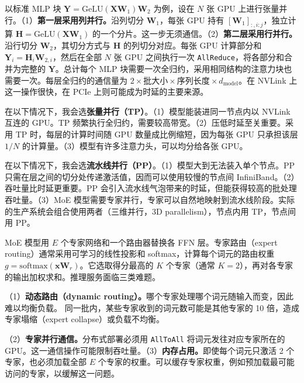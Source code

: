 \begin{interview}
以标准 MLP 块 \(\mathbf{Y}=\mathrm{GeLU}(\mathbf{X}\mathbf{W}_1)\mathbf{W}_2\) 为例，设在 \(N\) 张 GPU 上进行张量并行。（1）\textbf{第一层采用列并行。}沿列切分 \(\mathbf{W}_1\)，每张 GPU 持有 \([\mathbf{W}_1]_{:,i:j}\)，独立计算 \(\mathbf{H}=\mathrm{GeLU}(\mathbf{X}\mathbf{W}_1)\) 的一个分片。这一步无须通信。（2）\textbf{第二层采用行并行。}沿行切分 \(\mathbf{W}_2\)，其切分方式与 \(\mathbf{H}\) 的列切分对应。每张 GPU 计算部分和 \(\mathbf{Y}_i=\mathbf{H}_i\mathbf{W}_{2,i}\)，然后在全部 \(N\) 张 GPU 之间执行一次 \texttt{AllReduce}，将各部分和合并为完整的 \(\mathbf{Y}\)。总计每个 MLP 块需要一次全归约，采用相同结构的注意力块也需要一次。每层全归约的通信量为 \(2\times\text{批大小}\times\text{序列长度}\times d_{\mathrm{model}}\)。在 NVLink 上这一操作很快，在 PCIe 上则可能成为时延的主要来源。

在以下情况下，我会选\textbf{张量并行（TP）}。（1）模型能装进同一节点内以 NVLink 互连的 GPU。TP 频繁执行全归约，需要较高带宽。（2）压低时延至关重要。采用 TP 时，每层的计算时间随 GPU 数量成比例缩短，因为每张 GPU 只承担该层 \(1/N\) 的计算量。（3）模型有许多注意力头，可以均分给各张 GPU。

在以下情况下，我会选\textbf{流水线并行（PP）}。（1）模型大到无法装入单个节点。PP 只需在层之间的切分处传递激活值，因而可以使用较慢的节点间 InfiniBand。（2）吞吐量比时延更重要。PP 会引入流水线气泡带来的时延，但能获得较高的批处理吞吐量。（3）MoE 模型需要专家并行，专家可以自然地映射到流水线阶段。实际的生产系统会组合使用两者（三维并行，3D parallelism），节点内用 TP，节点间用 PP。

MoE 模型用 \(E\) 个专家网络和一个路由器替换各 FFN 层。专家路由（expert routing）通常采用可学习的线性投影和 softmax，计算每个词元的路由权重 \(g=\mathrm{softmax}(\mathbf{x}\mathbf{W}_r)\)。它选取得分最高的 \(K\) 个专家（通常 \(K=2\)），再对各专家的输出加权求和。推理服务面临三类难题。

（1）\textbf{动态路由（dynamic routing）。}哪个专家处理哪个词元随输入而变，因此难以均衡负载。
同一批内，某些专家收到的词元数可能是其他专家的 10 倍，造成专家塌缩（expert collapse）或负载不均衡。

（2）\textbf{专家并行通信。}分布式部署必须用 \texttt{AllToAll} 将词元发往对应专家所在的 GPU。这一通信操作可能限制吞吐量。（3）\textbf{内存占用。}即使每个词元只激活 2 个专家，也必须加载全部 \(E\) 个专家的权重。可以缓存专家权重，例如预加载最可能访问的专家，以缓解这一问题。


\end{interview}
